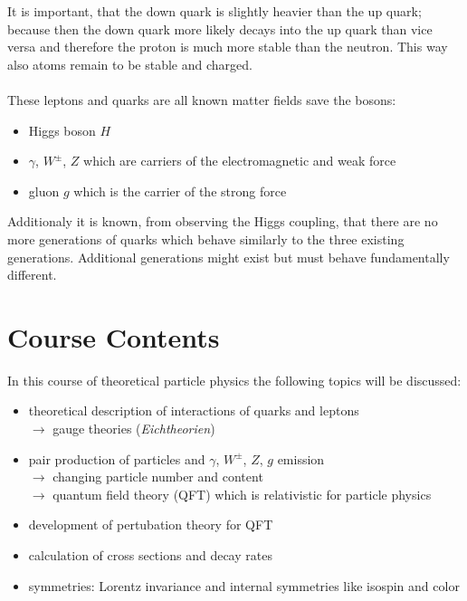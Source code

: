 \documentclass{include/thesisclass}
\newcommand{\df}{\rightarrow}
\begin{document}
It is important, that the down quark is slightly heavier than the up quark; because then the down quark more likely decays into the up quark than vice versa and therefore the proton is much more stable than the neutron. This way also atoms remain to be stable and charged.\\
\\
These leptons and quarks are all known matter fields save the bosons:
\begin{itemize}
\item Higgs boson $H$
\item $\gamma$, $W^\pm$, $Z$ which are carriers of the electromagnetic and weak force
\item gluon $g$ which is the carrier of the strong force
\end{itemize}
Additionaly it is known, from observing the Higgs coupling, that there are no more generations of quarks which behave similarly to the three existing generations. Additional generations might exist but must behave fundamentally different.

\section{Course Contents}
In this course of theoretical particle physics the following topics will be discussed:
\begin{itemize}
\item theoretical description of interactions of quarks and leptons\\
$\df$ gauge theories (\textit{Eichtheorien})
\item pair production of particles and $\gamma$, $W^\pm$, $Z$, $g$ emission\\
$\df$ changing particle number and content\\
$\df$ quantum field theory (QFT) which is relativistic for particle physics
\item development of pertubation theory for QFT
\item calculation of cross sections and decay rates
\item symmetries: Lorentz invariance and internal symmetries like isospin and color
\end{itemize} 
\end{document}
